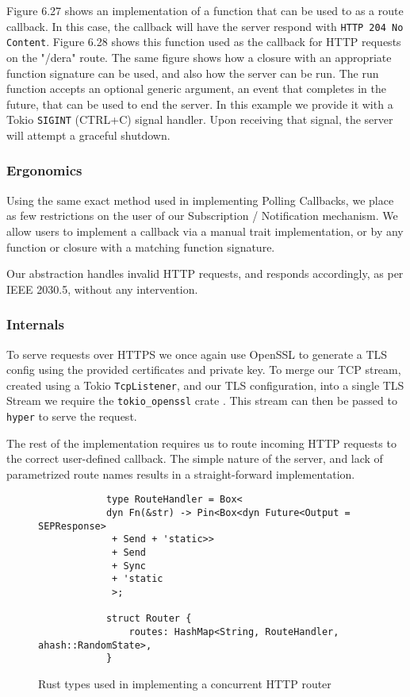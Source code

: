 Figure 6.27 shows an implementation of a function that can be used to as a route callback. In this case, the callback will have the server respond with \texttt{HTTP 204 No Content}. Figure 6.28 shows this function used as the callback for HTTP requests on the "/dera" route. The same figure shows how a closure with an appropriate function signature can be used, and also how the server can be run. 
The run function accepts an optional generic argument, an event that completes in the future, that can be used to end the server. In this example we provide it with a Tokio \texttt{SIGINT} (CTRL+C) signal handler. Upon receiving that signal, the server will attempt a graceful shutdown.

\subsubsection{Ergonomics}
Using the same exact method used in implementing Polling Callbacks, we place as few restrictions on the user of our Subscription / Notification mechanism. We allow users to implement a callback via a manual trait implementation, or by any function or closure with a matching function signature.

Our abstraction handles invalid HTTP requests, and responds accordingly, as per IEEE 2030.5, without any intervention.

\subsubsection{Internals}
To serve requests over HTTPS we once again use OpenSSL to generate a TLS config using the provided certificates and private key. To merge our TCP stream, created using a Tokio \texttt{TcpListener}, and our TLS configuration, into a single TLS Stream we require the \texttt{tokio\_openssl} crate \cite{tokioopenssl}. This stream can then be passed to \texttt{hyper} to serve the request.

The rest of the implementation requires us to route incoming HTTP requests to the correct user-defined callback. The simple nature of the server, and lack of parametrized route names results in a straight-forward implementation.

\begin{figure}[h]
    \begin{center}
        \begin{lstlisting}
            type RouteHandler = Box<
            dyn Fn(&str) -> Pin<Box<dyn Future<Output = SEPResponse>
             + Send + 'static>>
             + Send
             + Sync
             + 'static
             >;

            struct Router {
                routes: HashMap<String, RouteHandler, ahash::RandomState>,
            }

        \end{lstlisting}
        \label{fig:routerimpl}
        \vspace{-10pt}
        \caption{Rust types used in implementing a concurrent HTTP router}
    \end{center}
\end{figure}

